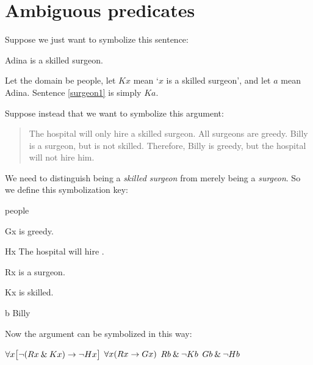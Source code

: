 %

\section{Ambiguous predicates}

Suppose we just want to symbolize this sentence:
\begin{earg}
\item[\ex{surgeon1}] Adina is a skilled surgeon.
\end{earg}
Let the domain be people, let $Kx$ mean `$x$ is a skilled surgeon', and let $a$ mean Adina. Sentence \ref{surgeon1} is simply $Ka$.


Suppose instead that we want to symbolize this argument:
\begin{quote}
The hospital will only hire a skilled surgeon. All surgeons are greedy. Billy is a surgeon, but is not skilled. Therefore, Billy is greedy, but the hospital will not hire him.
\end{quote}
We need to distinguish being a \emph{skilled surgeon} from merely being a \emph{surgeon}. So we define this symbolization key:
\begin{ekey}
\item[\text{domain}] people
\item[Gx]  is greedy.
\item[Hx] The hospital will hire .
\item[Rx]  is a surgeon.
\item[Kx]  is skilled.
\item[b] Billy
\end{ekey}

Now the argument can be symbolized in this way:
\begin{earg}
\label{surgeon2}
\prem $\forall x\bigl[\neg (Rx \mathbin{\&} Kx) \rightarrow \neg Hx\bigr]$
\prem $\forall x(Rx \rightarrow Gx)$
\prem $Rb \mathbin{\&} \neg Kb$
\conc $Gb \mathbin{\&} \neg Hb$
\end{earg}

